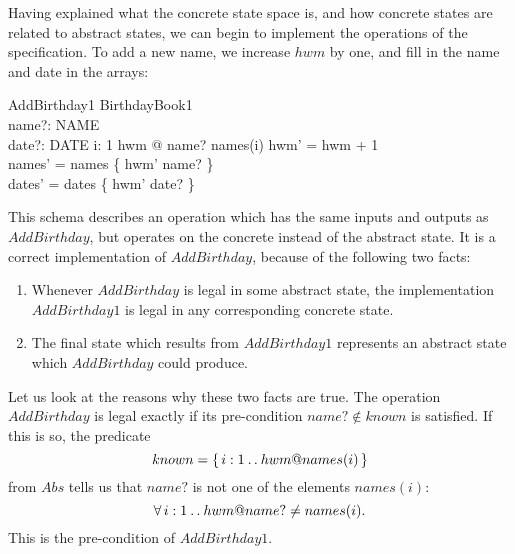 \documentclass[12pt]{article}
\begin{document}
Having explained what the concrete state space is, and how concrete states
are related to abstract states, we can begin to implement the operations
of the specification.
To add a new name, we increase $hwm$ by one, and fill in the name and date
in the arrays:
\begin{schema}{AddBirthday1}
	\Delta BirthdayBook1 \\
	name?: NAME \\
	date?: DATE
\where
	\forall i: 1 \upto hwm @ name? \neq names(i)
\also
	hwm' = hwm + 1 \\
	names' = names \oplus \{ hwm' \mapsto name? \} \\
	dates' = dates \oplus \{ hwm' \mapsto date? \}
\end{schema}
This schema describes an operation which has the same inputs and
outputs as $AddBirthday$, but operates on the concrete instead of the abstract
state. It is a correct implementation of $AddBirthday$, because of the
following two facts:
\begin{enumerate}
\item	Whenever $AddBirthday$ is legal in some abstract state,
	the implementation $AddBirthday1$ is legal in any corresponding
	concrete state.
\item	The final state which results from $AddBirthday1$ represents
	an abstract state which $AddBirthday$ could produce.
\end{enumerate}
Let us look at the reasons why these two facts are true.
The operation $AddBirthday$ is legal exactly if its pre-condition
$name? \notin known$ is satisfied.  If this is so, the predicate
\[
	known = \{\,i: 1 \mathbin{\ldotp\ldotp} hwm @ names(i)\,\}
\]
from $Abs$ tells us that $name?$ is not one of the elements $names(i)$:
\[
	\forall i: 1 \upto hwm @ name? \neq names(i).
\]
This is the pre-condition of $AddBirthday1$.
\end{document}
